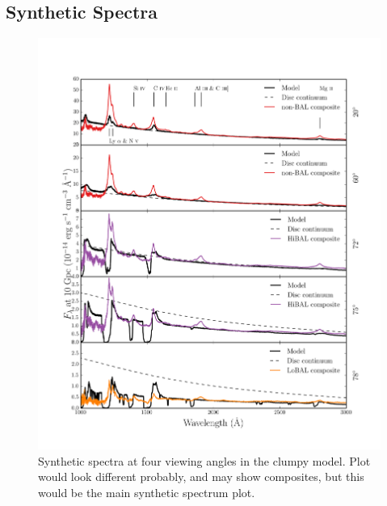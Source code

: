\documentclass[preprint, a4paper, 11pt]{aastex}
\begin{document}
\subsection{Synthetic Spectra}

\begin{figure} %
\centering
\includegraphics[width=1.0\textwidth]{figures/uvspec.png}
\caption
{
Synthetic spectra at four viewing angles in the clumpy model. Plot would look different probably,
and may show composites, but this would be the main synthetic spectrum plot.
}
\label{fig:uvspec}
\end{figure} %

\end{document}
